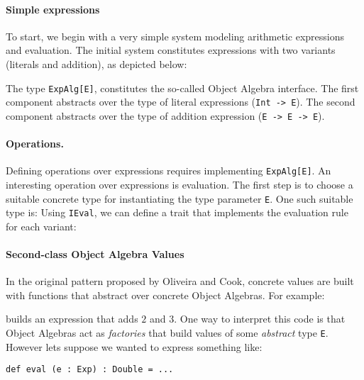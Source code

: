 \paragraph{Simple expressions}
To start, we begin with a very simple system modeling arithmetic expressions and
evaluation. The initial system constitutes expressions with two variants
(literals and addition), as depicted below:

\noindent The type \lstinline{ExpAlg[E]}, constitutes the
so-called Object Algebra interface. The first component abstracts over the type
of literal expressions (\lstinline{Int -> E}). The second component abstracts
over the type of addition expression (\lstinline{E -> E -> E}).

\paragraph{Operations.} Defining operations over expressions requires
implementing \lstinline{ExpAlg[E]}. An interesting operation over expressions is
evaluation. The first step is to choose a suitable concrete type for
instantiating the type parameter \lstinline{E}. One such suitable type is:
Using \lstinline{IEval}, we can define a trait that implements the evaluation
rule for each variant:

\paragraph{Second-class Object Algebra Values} In the original pattern
proposed by Oliveira and Cook, concrete values are built with
functions that abstract over concrete Object Algebras. For example:


\noindent builds an expression that adds $2$ and $3$. One way to
interpret this code is that Object Algebras act as \emph{factories}
that build values of some \emph{abstract} type \lstinline{E}. However
lets suppose we wanted to express something like:

\begin{lstlisting}
def eval (e : Exp) : Double = ...
\end{lstlisting}

